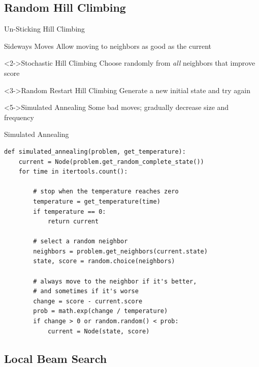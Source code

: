 \documentclass[14pt]{beamer}
\begin{document}
\subsection{Random Hill Climbing}


\begin{frame}{Un-Sticking Hill Climbing}
\begin{block}{Sideways Moves}
Allow moving to neighbors as good as the current
\end{block}
\begin{block}<2->{Stochastic Hill Climbing}
Choose randomly from \textit{all} neighbors that improve score
\end{block}
\begin{block}<3->{Random Restart Hill Climbing}
Generate a new initial state and try again 
\end{block}
\begin{block}<5->{Simulated Annealing}
Some bad moves; gradually decrease size and frequency \\
\end{block}
\end{frame}


\begin{frame}[fragile]{Simulated Annealing}
\scriptsize
\begin{lstlisting}
def simulated_annealing(problem, get_temperature):
    current = Node(problem.get_random_complete_state())
    for time in itertools.count():

        # stop when the temperature reaches zero
        temperature = get_temperature(time)
        if temperature == 0:
            return current

        # select a random neighbor
        neighbors = problem.get_neighbors(current.state)
        state, score = random.choice(neighbors)

        # always move to the neighbor if it's better,
        # and sometimes if it's worse
        change = score - current.score
        prob = math.exp(change / temperature)
        if change > 0 or random.random() < prob:
            current = Node(state, score)
\end{lstlisting}
\end{frame}


\subsection{Local Beam Search}
\end{document}
